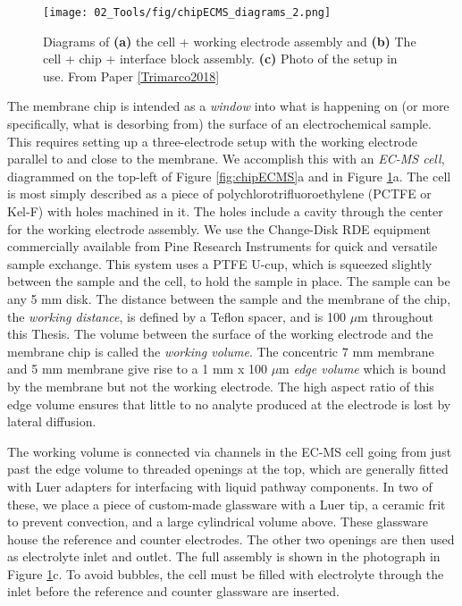 \begin{figure}[t]
	\centering
	\texttt{[image: 02\_Tools/fig/chipECMS\_diagrams\_2.png]}
	\caption{Diagrams of \textbf{(a)} the cell + working electrode assembly and \textbf{(b)} The cell + chip + interface block assembly. \textbf{(c)} Photo of the setup in use. From Paper \ref{Trimarco2018}}
	\label{fig:chipECMS2}
\end{figure}

The membrane chip is intended as a \textit{window} into what is happening on (or more specifically, what is desorbing from) the surface of an electrochemical sample. This requires setting up a three-electrode setup with the working electrode parallel to and close to the membrane. We accomplish this with an \textit{EC-MS cell}, diagrammed on the top-left of Figure \ref{fig:chipECMS}a and in Figure \ref{fig:chipECMS2}a. The cell is most simply described as a piece of polychlorotrifluoroethylene (PCTFE or Kel-F) with holes machined in it. The holes include a cavity through the center for the working electrode assembly. We use the Change-Disk RDE equipment commercially available from Pine Research Instruments for quick and versatile sample exchange. This system uses a PTFE U-cup, which is squeezed slightly between the sample and the cell, to hold the sample in place. The sample can be any 5 mm disk. The distance between the sample and the membrane of the chip, the \textit{working distance}, is defined by a Teflon spacer, and is 100 $\mu$m throughout this Thesis. The volume between the surface of the working electrode and the membrane chip is called the \textit{working volume}. The concentric 7 mm membrane and 5 mm membrane give rise to a 1 mm x 100 $\mu$m \textit{edge volume} which is bound by the membrane but not the working electrode. The high aspect ratio of this edge volume ensures that little to no analyte produced at the electrode is lost by lateral diffusion. 

The working volume is connected via channels in the EC-MS cell going from just past the edge volume to threaded openings at the top, which are generally fitted with Luer adapters for interfacing with liquid pathway components. In two of these, we place a piece of custom-made glassware with a Luer tip, a ceramic frit to prevent convection, and a large cylindrical volume above. These glassware house the reference and counter electrodes. The other two openings are then used as electrolyte inlet and outlet. The full assembly is shown in the photograph in Figure \ref{fig:chipECMS2}c. To avoid bubbles, the cell must be filled with electrolyte through the inlet before the reference and counter glassware are inserted.

